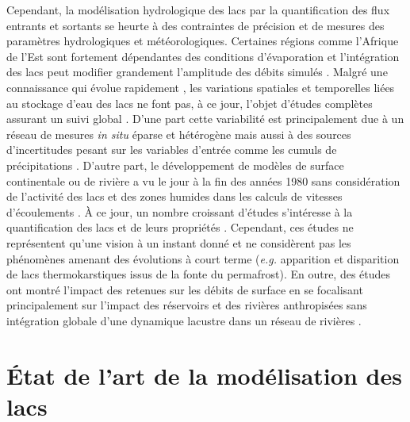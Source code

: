 Cependant, la modélisation hydrologique des lacs par la quantification des flux entrants et sortants se heurte à des contraintes de précision et de mesures des paramètres hydrologiques et météorologiques. Certaines régions comme l'Afrique de l'Est sont fortement dépendantes des conditions d'évaporation et l'intégration des lacs peut modifier grandement l'amplitude des débits simulés \citep{zajac2017}. 
Malgré une connaissance qui évolue rapidement \citep{gibson2006,swenson2009,gronewold2016}, les variations spatiales et temporelles liées au stockage d’eau des lacs ne font pas, à ce jour, l’objet d’études complètes assurant un suivi global \citep{alsdorf2003}. D’une part cette variabilité est principalement due à un réseau de mesures \textit{in situ} éparse et hétérogène \citep{alsdorf2007} mais aussi à des sources d'incertitudes pesant sur les variables d'entrée comme les cumuls de précipitations \citep{fekete2004}. D’autre part, le développement de modèles de surface continentale ou de rivière a vu le jour à la fin des années 1980 sans considération de l’activité des lacs et des zones humides dans les calculs de vitesses d’écoulements \citep{downing2010}. À ce jour, un nombre croissant d’études s’intéresse à la quantification des lacs et de leurs propriétés \citep{doll2003,downing2006,mcdonald2012,verpoorter2014}. Cependant, ces études ne représentent qu’une vision à un instant donné et ne considèrent pas les phénomènes amenant des évolutions à court terme (\textit{e.g.} apparition et disparition de lacs thermokarstiques issus de la fonte du permafrost). En outre, des études ont montré l'impact des retenues sur les débits de surface en se focalisant principalement sur l'impact des réservoirs et des rivières anthropisées sans intégration globale d'une dynamique lacustre dans un réseau de rivières \citep{haddeland2006,hanasaki2006,doll2009,zhou2016}.

\section{{\selectfont \'Etat de l'art de la modélisation des lacs}}

